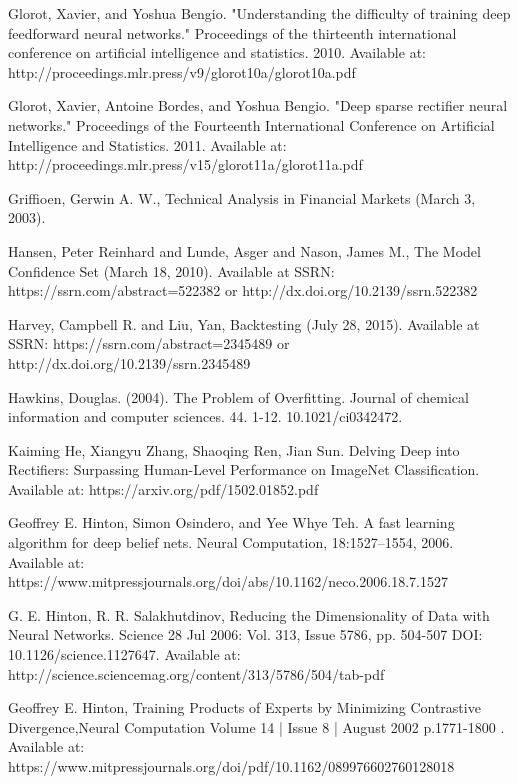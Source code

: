 \documentclass[a4paper,11pt,oneside]{article}
\theoremstyle{plain}
\theoremstyle{definition}
\begin{document}
\begin{thebibliography}{bibliography}
Glorot, Xavier, and Yoshua Bengio. "Understanding the difficulty of training deep feedforward neural networks." Proceedings of the thirteenth international conference on artificial intelligence and statistics. 2010.
Available at: http://proceedings.mlr.press/v9/glorot10a/glorot10a.pdf

Glorot, Xavier, Antoine Bordes, and Yoshua Bengio. "Deep sparse rectifier neural networks." Proceedings of the Fourteenth International Conference on Artificial Intelligence and Statistics. 2011.
Available at: http://proceedings.mlr.press/v15/glorot11a/glorot11a.pdf 

Griffioen, Gerwin A. W., Technical Analysis in Financial Markets (March 3, 2003).

Hansen, Peter Reinhard and Lunde, Asger and Nason, James M., The Model Confidence Set (March 18, 2010). Available at SSRN: https://ssrn.com/abstract=522382 or http://dx.doi.org/10.2139/ssrn.522382

Harvey, Campbell R. and Liu, Yan, Backtesting (July 28, 2015). Available at SSRN: https://ssrn.com/abstract=2345489 or http://dx.doi.org/10.2139/ssrn.2345489

Hawkins, Douglas. (2004). The Problem of Overfitting. Journal of chemical information and computer sciences. 44. 1-12. 10.1021/ci0342472. 

Kaiming He,  Xiangyu Zhang,  Shaoqing Ren,  Jian Sun. Delving Deep into Rectifiers: Surpassing Human-Level Performance on ImageNet Classification. Available at: https://arxiv.org/pdf/1502.01852.pdf

Geoffrey E. Hinton, Simon Osindero, and Yee Whye Teh. A fast learning algorithm for deep belief nets. Neural Computation, 18:1527–1554, 2006. 
Available at: https://www.mitpressjournals.org/doi/abs/10.1162/neco.2006.18.7.1527

G. E. Hinton, R. R. Salakhutdinov, Reducing the Dimensionality of Data with Neural 
Networks. Science  28 Jul 2006: Vol. 313, Issue 5786, pp. 504-507 DOI: 
10.1126/science.1127647. Available at: http://science.sciencemag.org/content/313/5786/504/tab-pdf

Geoffrey E. Hinton, Training Products of Experts by Minimizing Contrastive Divergence,Neural Computation
Volume 14 | Issue 8 | August 2002  p.1771-1800 . Available at: https://www.mitpressjournals.org/doi/pdf/10.1162/089976602760128018


\end{thebibliography}
\end{document}
